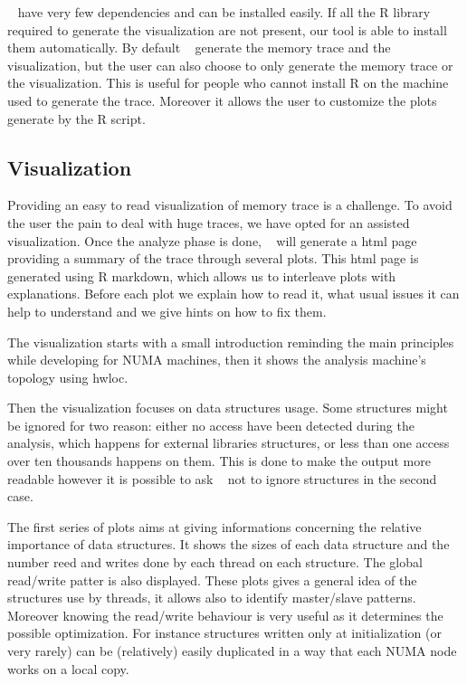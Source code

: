 \TABARNAC~ have very few dependencies and can be installed easily. If all the R
library required to generate the visualization are not present, our tool is
able to install them automatically. By default \TABARNAC~ generate the memory
trace and the visualization, but the user can also choose to only generate the
memory trace or the visualization. This is useful for people who cannot
install R on the machine used to generate the trace. Moreover it allows the
user to customize the plots generate by the R script.

\subsection{Visualization}
\label{sec:design-visu}

Providing an easy to read visualization of memory trace is a challenge. To
avoid the user the pain to deal with huge traces, we have opted for an
assisted visualization. Once the analyze phase is done, \TABARNAC~ will
generate a html page providing a summary of the trace through several plots.
This html page is generated using R markdown, which allows us to interleave
plots with explanations. Before each plot we explain how to read it, what
usual issues it can help to understand and we give hints on how to fix them.

The visualization starts with a small introduction reminding the main
principles while developing for NUMA machines, then it shows the analysis
machine's topology using hwloc\cite{Broquedis10hwloc}.

Then the visualization focuses on data structures usage. Some structures might
be ignored for two reason: either no access have been detected during the
analysis, which happens for external libraries structures, or less than one
access over ten thousands happens on them. This is done to make the output
more readable however it is possible to ask \TABARNAC~ not to ignore
structures in the second case.

The first series of plots aims at giving informations concerning the relative
importance of data structures. It shows the sizes of each data structure and the
number reed and writes done by each thread on each structure. The global
read/write patter is also displayed. These plots gives a general idea of the
structures use by threads, it allows also to identify master/slave patterns.
Moreover knowing the read/write behaviour is very useful as it determines the
possible optimization. For instance structures written only at initialization
(or very rarely) can be (relatively) easily duplicated in a way that each NUMA
node works on a local copy.

